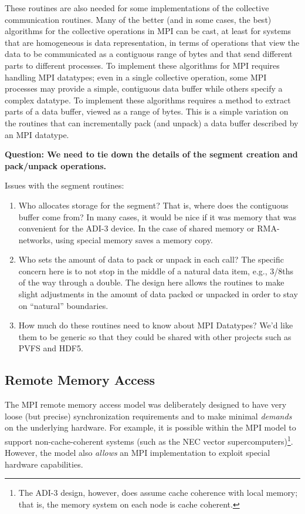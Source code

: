 These routines are also needed for some implementations of the
collective communication routines.  Many of the better (and in some
cases, the best) algorithms for the collective operations in MPI can
be cast, at least for systems that are homogeneous is data
representation, in terms of operations that view the data to be
communicated as a contiguous range of bytes and that send different
parts to different processes.  To implement these algorithms for MPI
requires handling MPI datatypes; even in a single collective
operation, some MPI processes may provide a simple, contiguous data
buffer while others specify a complex datatype.  To implement these
algorithms requires a method to extract parts of a data buffer, viewed
as a range of bytes.  This is a simple variation on the routines that
can incrementally pack (and unpack) a data buffer described by an MPI
datatype.  


\textbf{Question: We need to tie down the details of the segment
creation and pack/unpack operations.}

Issues with the segment routines:
\begin{enumerate}
\item Who allocates storage for the segment?  That is, where does the
contiguous buffer come from?  In many cases, it would be nice if it
was memory that was convenient for the ADI-3 device.  In the case of
shared memory or RMA-networks, using special memory saves a memory
copy.

\item Who sets the amount of data to pack or unpack in each call?
The specific concern here is to not stop in the middle of a natural
data item, e.g., 3/8ths of the way through a double.  The design here
allows the routines to make slight adjustments in the amount of data
packed or unpacked in order to stay on ``natural'' boundaries.  

\item How much do these routines need to know about MPI Datatypes?
We'd like them to be generic so that they could be shared with other
projects such as PVFS and HDF5.  
\end{enumerate}


\subsection{Remote Memory Access}
\label{sec:rma-design}
The MPI remote memory access model was deliberately designed to have
very loose (but precise) synchronization requirements and to make
minimal \emph{demands} on 
the 
underlying hardware.  For example, it is possible within the MPI model
to support non-cache-coherent systems (such as the NEC vector
supercomputers)\footnote{The ADI-3 design, however, does assume cache
coherence with local memory; that is, the memory system on each node
is cache coherent.}.  However, the model also \emph{allows} an MPI 
implementation to exploit special hardware capabilities.  


